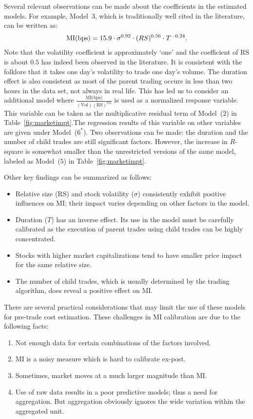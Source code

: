Several relevant observations can be made about the coefficients in the estimated models. For example, Model~$3$, which is traditionally well cited in the literature, can be written as:
	\[
	\text{MI(\text{bps})}= 15.9 \cdot \sigma^{0.92} \cdot(RS)^{0.56} \cdot T^{-0.24}.
	\]
Note that the volatility coefficient is approximately `one' and the coefficient of RS is about $0.5$ has indeed been observed in the literature. It is consistent with the folklore that it takes one day's volatility to trade one day's volume. The duration effect is also consistent as most of the parent trading occurs in less than two hours in the data set, not always in real life. This has led us to consider an additional model where $\frac{\text{MI(bps)}}{(\text{Vol})(\text{RS})^{0.6}}$ is used as a normalized response variable. This variable can be taken as the multiplicative residual term of Model~($2$) in Table~\ref{fig:marketimpt}.The regression results of this variable on other variables are given under Model~($6^*$). Two observations can be made: the duration and the number of child trades are still significant factors. However, the increase in $R$-square is somewhat smaller than the unrestricted versions of the same model, labeled as Model~($5$) in Table~\ref{fig:marketimpt}.


Other key findings can be summarized as follows:
        \begin{itemize}
        \item Relative size (RS) and stock volatility ($\sigma$) consistently exhibit positive influences on MI; their impact varies depending on other factors in the model.
        \item Duration ($T$) has an inverse effect. Its use in the model must be carefully calibrated as the execution of parent trades using child trades can be highly concentrated.
        \item Stocks with higher market capitalizations tend to have smaller price impact for the same relative size.
        \item The number of child trades, which is usually determined by the trading algorithm, does reveal a positive effect on MI.
        \end{itemize}
There are several practical considerations that may limit the use of these models for pre-trade cost estimation. These challenges in MI calibration are due to the following facts:
	\begin{enumerate}[--]
	\item Not enough data for certain combinations of the factors involved.
	\item MI is a noisy measure which is hard to calibrate ex-post.
	\item Sometimes, market moves at a much larger magnitude than MI.
	\item Use of raw data results in a poor predictive models; thus a need for aggregation. But aggregation obviously ignores the wide variation within the aggregated unit. 
	\end{enumerate} \label{in:impact2}